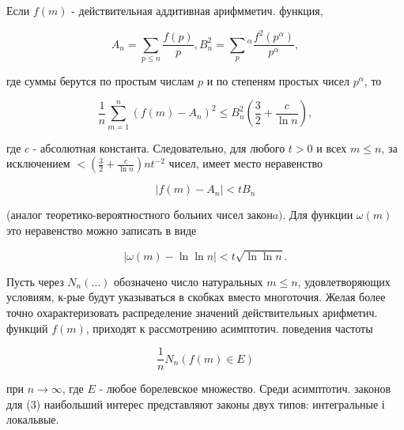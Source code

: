 \documentclass[10pt]{article}
\begin{document}
Если $f(m)$ - действительная аддитивная арифмметич. функция,



\[

A_{n}=\sum_{p \leqslant n} \frac{f(p)}{p}, B_{n}^{2}=\sum_{p}{ }^{\alpha} \frac{f^{2}\left(p^{\alpha}\right)}{p^{\alpha}},

\]



где суммы берутся по простым числам $p$ и по степеням простых чисел $p^{\alpha}$, то



\[

\frac{1}{n} \sum_{m=1}^{n}\left(f(m)-A_{n}\right)^{2} \leqslant B_{n}^{2}\left(\frac{3}{2}+\frac{c}{\ln n}\right),

\]



где $c$ - абсолютная константа. Следовательно, для любого $t>0$ и всех $m \leqslant n$, за исключением $<\left(\frac{3}{2}+\frac{c}{\ln n}\right) n t^{-2}$ чисел, имеет место неравенство



\[

\left|f(m)-A_{n}\right|<t B_{n}

\]



(аналог теоретико-вероятностного больиих чисел зако$н a)$. Для функции $\omega(m)$ это неравенство можно записать в виде



\[

|\omega(m)-\ln \ln n|<t \sqrt{\ln \ln n} .

\]



Пусть через $N_{n}(\ldots)$ обозначено число натуральных $m \leqslant n$, удовлетворяющих условиям, к-рые будут указываться в скобках вместо многоточия. Желая более точно охарактеризовать распределение значений действительных арифметич. функций $f(m)$, приходят к рассмотрению асимптотич. поведения частоты



\[

\frac{1}{n} N_{n}(f(m) \in E)

\]



при $n \rightarrow \infty$, где $E$ - любое борелевское множество. Среди асимптотич. законов для (3) наибольший интерес представляют законы двух типов: интегральные і локальвые.
\end{document}
